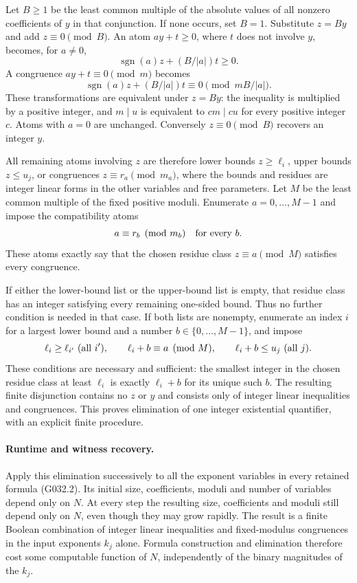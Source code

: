 Let $B\ge1$ be the least common multiple of the absolute
values of all nonzero coefficients of $y$ in that conjunction.
If none occurs, set $B=1$. Substitute $z=By$ and add
$z\equiv0\pmod B$.
An atom $ay+t\ge0$, where $t$ does not involve $y$,
becomes, for $a\ne0$,
\[
 \operatorname{sgn}(a)z+(B/|a|)t\ge0.
\]
A congruence $ay+t\equiv0\pmod m$ becomes
\[
 \operatorname{sgn}(a)z+(B/|a|)t
                   \equiv0\pmod{mB/|a|}.
\]
These transformations are equivalent under $z=By$:
the inequality is multiplied by a positive integer, and
$m\mid u$ is equivalent to $cm\mid cu$ for every
positive integer $c$. Atoms with $a=0$ are unchanged.
Conversely $z\equiv0\pmod B$ recovers an integer $y$.

All remaining atoms involving $z$ are therefore lower bounds
$z\ge\ell_i$, upper bounds $z\le u_j$, or congruences
$z\equiv r_a\pmod{m_a}$, where the bounds and residues
are integer linear forms in the other variables and free
parameters. Let $M$ be the least common multiple of the
fixed positive moduli. Enumerate $a=0,\ldots,M-1$ and
impose the compatibility atoms
\[
                      a\equiv r_b\pmod{m_b}
                 \quad\hbox{for every }b.
\]
These atoms exactly say that the chosen residue class
$z\equiv a\pmod M$ satisfies every congruence.

If either the lower-bound list or the upper-bound list is
empty, that residue class has an integer satisfying every
remaining one-sided bound. Thus no further condition is
needed in that case. If both lists are nonempty, enumerate
an index $i$ for a largest lower bound and a number
$b\in\{0,\ldots,M-1\}$, and impose
\[
 \ell_i\ge\ell_{i'}\ (\hbox{all }i'),\qquad
 \ell_i+b\equiv a\pmod M,\qquad
 \ell_i+b\le u_j\ (\hbox{all }j).
\]
These conditions are necessary and sufficient: the smallest
integer in the chosen residue class at least $\ell_i$ is
exactly $\ell_i+b$ for its unique such $b$.
The resulting finite disjunction contains no $z$ or $y$
and consists only of integer linear inequalities and
congruences. This proves elimination of one integer
existential quantifier, with an explicit finite procedure.

\paragraph{Runtime and witness recovery.}
Apply this elimination successively to all the exponent
variables in every retained formula (G032.2). Its initial
size, coefficients, moduli and number of variables depend
only on $N$. At every step the resulting size, coefficients
and moduli still depend only on $N$, even though they may
grow rapidly. The result is a finite Boolean combination
of integer linear inequalities and fixed-modulus
congruences in the input exponents $k_j$ alone.
Formula construction and elimination therefore cost some
computable function of $N$, independently of the binary
magnitudes of the $k_j$.

